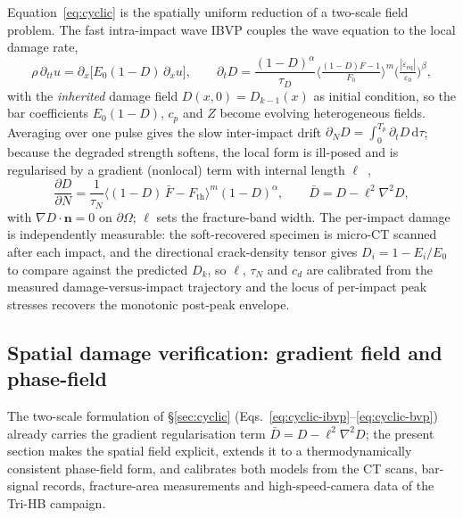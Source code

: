 \documentclass[11pt]{article}
\begin{document}
Equation~\eqref{eq:cyclic} is the spatially uniform reduction of a two-scale
field problem. The fast intra-impact wave IBVP couples the wave equation to the
local damage rate,
\begin{equation}
\rho\,\partial_{tt}u=\partial_x\!\big[E_0(1-D)\,\partial_x u\big],\qquad
\partial_t D=\frac{(1-D)^{\alpha}}{\tau_D}\Big\langle\tfrac{(1-D)F-1}{F_0}\Big\rangle^{m}\Big(\tfrac{|\dot\varepsilon_{\mathrm{eq}}|}{\dot\varepsilon_0}\Big)^{\beta},
\label{eq:cyclic-ibvp}
\end{equation}
with the \emph{inherited} damage field $D(x,0)=D_{k-1}(x)$ as initial condition,
so the bar coefficients $E_0(1-D)$, $c_p$ and $Z$ become evolving heterogeneous
fields. Averaging over one pulse gives the slow inter-impact drift
$\partial_N D=\int_0^{T_p}\partial_t D\,\mathrm{d}\tau$; because the degraded
strength softens, the local form is ill-posed and is regularised by a gradient
(nonlocal) term with internal length $\ell$~\citep{pijaudier1987},
\begin{equation}
\frac{\partial D}{\partial N}=\frac{1}{\tau_N}\big\langle(1-D)\,\bar F-F_{\mathrm{th}}\big\rangle^{m}(1-D)^{\alpha},
\qquad \bar D=D-\ell^2\nabla^2 D,
\label{eq:cyclic-bvp}
\end{equation}
with $\nabla D\cdot\mathbf{n}=0$ on $\partial\Omega$; $\ell$ sets the
fracture-band width. The per-impact damage is independently measurable: the
soft-recovered specimen is micro-CT scanned after each impact, and the directional
crack-density tensor gives $D_i=1-E_i/E_0$ to compare against the predicted $D_k$,
so $\ell$, $\tau_N$ and $c_d$ are calibrated from the measured
damage-versus-impact trajectory and the locus of per-impact peak stresses recovers
the monotonic post-peak envelope.

\subsection{Spatial damage verification: gradient field and phase-field}\label{sec:spatial}

The two-scale formulation of \S\ref{sec:cyclic}
(Eqs.~\eqref{eq:cyclic-ibvp}--\eqref{eq:cyclic-bvp}) already carries the gradient
regularisation term $\bar D=D-\ell^2\nabla^2 D$; the present section makes the
spatial field explicit, extends it to a thermodynamically consistent phase-field
form, and calibrates both models from the CT scans, bar-signal records, fracture-area
measurements and high-speed-camera data of the Tri-HB campaign.
\end{document}
